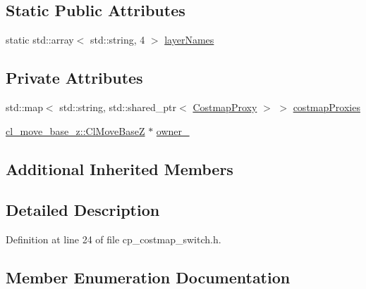 \subsection*{Static Public Attributes}
\begin{DoxyCompactItemize}
\item 
static std\+::array$<$ std\+::string, 4 $>$ \hyperlink{classcl__move__base__z_1_1CostmapSwitch_aee0c75c8f4459cacaf583ef8c90ff329}{layer\+Names}
\end{DoxyCompactItemize}
\subsection*{Private Attributes}
\begin{DoxyCompactItemize}
\item 
std\+::map$<$ std\+::string, std\+::shared\+\_\+ptr$<$ \hyperlink{classcl__move__base__z_1_1CostmapProxy}{Costmap\+Proxy} $>$ $>$ \hyperlink{classcl__move__base__z_1_1CostmapSwitch_a3a574ac1f7f3eff19cdf7ad0e15297e4}{costmap\+Proxies}
\item 
\hyperlink{classcl__move__base__z_1_1ClMoveBaseZ}{cl\+\_\+move\+\_\+base\+\_\+z\+::\+Cl\+Move\+BaseZ} $\ast$ \hyperlink{classcl__move__base__z_1_1CostmapSwitch_a42a7da3f7301daa691ef1593ae926618}{owner\+\_\+}
\end{DoxyCompactItemize}
\subsection*{Additional Inherited Members}


\subsection{Detailed Description}


Definition at line 24 of file cp\+\_\+costmap\+\_\+switch.\+h.



\subsection{Member Enumeration Documentation}
\mbox{\label{classcl__move__base__z_1_1CostmapSwitch_af38aeee5e3893e689cd74ddddfe0df15}} 

